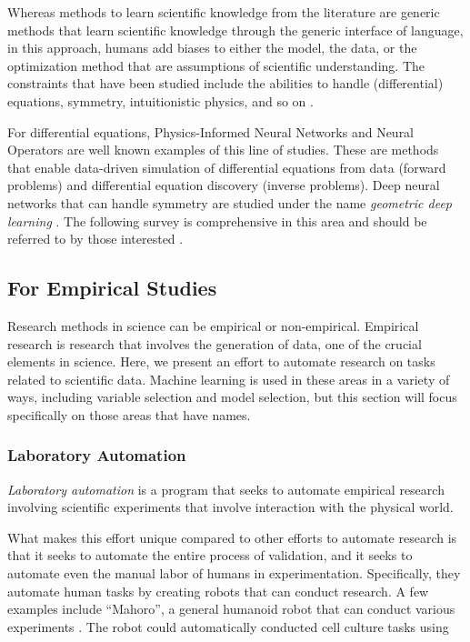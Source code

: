 Whereas methods to learn scientific knowledge from the literature are generic methods that learn scientific knowledge through the generic interface of language, in this approach, humans add biases to either the model, the data, or the optimization method that are assumptions of scientific understanding. The constraints that have been studied include the abilities to handle (differential) equations, symmetry, intuitionistic physics, and so on \cite{hao2022physics}. 

For differential equations, Physics-Informed Neural Networks \cite{raissi2019physics} and Neural Operators \cite{kovachki2021neural} are well known examples of this line of studies. These are methods that enable data-driven simulation of differential equations from data (forward problems) and differential equation discovery (inverse problems). Deep neural networks that can handle symmetry are studied under the name \textit{geometric deep learning} \cite{bronstein2021geometric}. The following survey is comprehensive in this area and should be referred to by those interested \cite{hao2022physics}.

\subsection{For Empirical Studies}
Research methods in science can be empirical or non-empirical. Empirical research is research that involves the generation of data, one of the crucial elements in science. Here, we present an effort to automate research on tasks related to scientific data. Machine learning is used in these areas in a variety of ways, including variable selection and model selection, but this section will focus specifically on those areas that have names.

\subsubsection{Laboratory Automation}
\textit{Laboratory automation} is a program that seeks to automate empirical research involving scientific experiments that involve interaction with the physical world.

What makes this effort unique compared to other efforts to automate research is that it seeks to automate the entire process of validation, and it seeks to automate even the manual labor of humans in experimentation. Specifically, they automate human tasks by creating robots that can conduct research. A few examples include ``Mahoro'', a general humanoid robot that can conduct various experiments \cite{yachie2017robotic}. The robot could automatically conducted cell culture tasks using \cite{ochiai2021variable}

